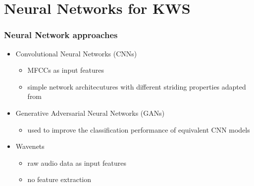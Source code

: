 
\section{Neural Networks for KWS}

\begin{frame}
  \frametitle{Neural Network approaches}
  \begin{itemize}
    \item Convolutional Neural Networks (CNNs)
    \begin{itemize}
      \item MFCCs as input features
      \item simple network architecutures with different striding properties adapted from \cite{Sainath2015}
    \end{itemize}
    \item Generative Adversarial Neural Networks (GANs) \cite{Goodfellow2014}
    \begin{itemize}
      \item used to improve the classification performance of equivalent CNN models
    \end{itemize}
    \item Wavenets \cite{Oord2016}
    \begin{itemize}
      \item raw audio data as input features
      \item no feature extraction
    \end{itemize}
  \end{itemize}
\end{frame}

